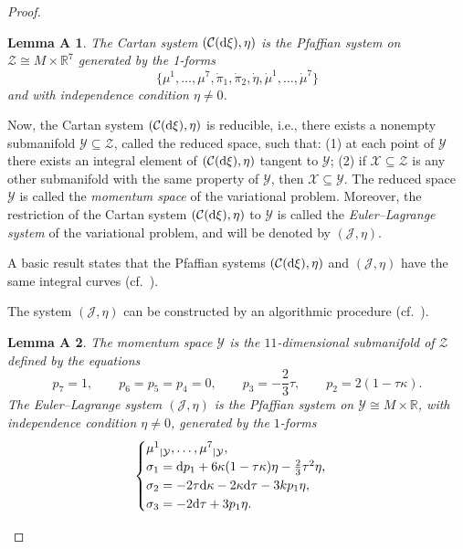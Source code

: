 \documentclass[10pt,a4paper]{amsart}
\numberwithin{equation}{section}
\newtheorem{lemmaA}{Lemma A\ignorespaces}
\begin{document}
\begin{proof}
\begin{lemmaA}%
The Cartan system $(\mathcal{C}({\rm d}\xi), \eta)$
is the Pfaffian system on $\mathcal{Z} \cong M\times \mathbb{R}^7$ generated by
the 1-forms
\[
\big\{\mu^1,\dots,\mu^7,\dot\pi_1,\dot\pi_2,\dot\eta,\dot\mu^1,\dots,\dot\mu^7\big\}
\]
and with independence condition $\eta\neq 0$.
\end{lemmaA}

Now, the Cartan system $(\mathcal{C}({\rm d}\xi), \eta)$ is reducible, i.e., there exists a nonempty submanifold
$\mathcal{Y} \subseteq \mathcal{Z}$, called the reduced space, such that: (1) at each point of $\mathcal{Y}$
there exists an integral element
of $(\mathcal{C}({\rm d}\xi), \eta)$ tangent to $\mathcal{Y}$; (2) if $\mathcal{X} \subseteq \mathcal{Z}$ is any other
submanifold with the same property of $\mathcal{Y}$, then $\mathcal{X} \subseteq\mathcal{Y}$.
The reduced space $\mathcal{Y}$ is called the \textit{momentum space} of
the variational problem. Moreover, the restriction of the Cartan system $(\mathcal{C}({\rm d}\xi), \eta)$ to $\mathcal{Y}$
is called the \textit{Euler--Lagrange system}
of the variational problem, and will be denoted by $(\mathcal{J}, \eta)$.

A basic result states that the Pfaffian systems $(\mathcal{C}({\rm d}\xi), \eta)$ and $(\mathcal{J}, \eta)$ have
the same integral curves (cf.~\cite{Gr, GM}).

The system $(\mathcal{J}, \eta)$ can be constructed by an algorithmic procedure (cf.~\cite{Gr}).

\begin{lemmaA}\label{l:EL-system}
The momentum space $\mathcal{Y}$ is the $11$-dimensional submanifold of $\mathcal{Z}$ defined by the
equations
\[
p_7 =1, \qquad p_6= p_5 = p_4=0 , \qquad p_3 = -\frac23\tau, \qquad p_2=2(1-\tau\kappa) .
\]
The Euler--Lagrange system $(\mathcal{J}, \eta)$ is the Pfaffian system
on $\mathcal{Y}\cong M\times \mathbb R$, with independence
condition $\eta\neq 0$, generated by the $1$-forms
\begin{equation}\label{generators-EL-syst}
\begin{cases}
{\mu^1}_{|\mathcal{Y}}, \dots, {\mu^7}_{|\mathcal{Y}}, \\
\sigma_1 = {\rm d}p_1 + 6 \kappa (1-\tau\kappa)\eta -\frac23 \tau^2\eta  ,\\
\sigma_2 = -2\tau {\rm d}\kappa -2\kappa {\rm d}\tau -3kp_1 \eta ,\\
\sigma_3 = - 2{\rm d}\tau + 3 p_1 \eta .\end{cases}
\end{equation}
\end{lemmaA}


\end{proof}
\end{document}
